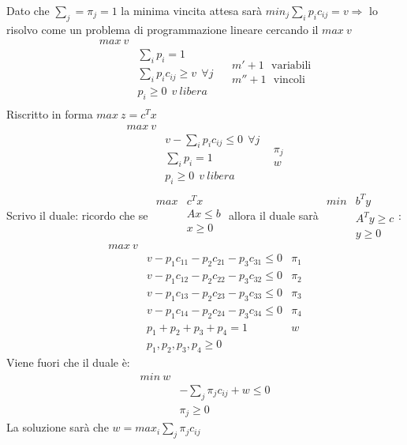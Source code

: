 \documentclass[12pt,a4paper]{article}
\begin{document}
Dato che $\sum_j = \pi_j =1$ la minima vincita attesa sarà $min_j\sum_ip_i c_{ij} = v \Rightarrow$ lo risolvo come un problema di programmazione lineare cercando il $max \ v$
 $$\begin{array}{rl}
 max \ v & \\
  & \sum_ip_i =1\\
  & \sum_i p_i c_{ij} \geq v \ \ \forall j\\
  & p_i \geq 0 \ \ v \ libera\\
 \end{array} \ \ \ \ \begin{array}{c}
 m' + 1 \ \ \ \text{variabili}\\
 m'' + 1 \ \ \ \text{vincoli}
 \end{array}$$
 Riscritto in forma $max \ z = c^Tx$
  $$\begin{array}{rl}
 max \ v & \\
  & v - \sum_i p_i c_{ij} \leq 0 \ \ \forall j\\
  & \sum_ip_i =1\\
  & p_i \geq 0 \ \ v \ libera\\
 \end{array}\ \ 
 \begin{array}{c}
 \pi_j\\
 w
 \end{array}$$
 Scrivo il duale: ricordo che se $\begin{array}{rl}max & c^Tx \\
 & Ax \leq b\\
 & x \geq 0\\
 \end{array}$ allora il duale sarà $\begin{array}{rl}
 min & b^Ty\\
 & A^Ty \geq c\\
 & y \geq 0 \end{array}$: 
 $$\begin{array}{rlc}
 max \ v &  & \\
 & v-p_1c_{11}-p_2c_{21}-p_3c_{31} \leq 0 & \pi_1\\
 & v-p_1c_{12}-p_2c_{22}-p_3c_{32} \leq 0 & \pi_2\\
 & v-p_1c_{13}-p_2c_{23}-p_3c_{33} \leq 0 & \pi_3\\
 & v-p_1c_{14}-p_2c_{24}-p_3c_{34} \leq 0 & \pi_4\\
 & p_1+p_2+p_3+p_4 = 1 & w\\
 & p_1,p_2,p_3,p_4 \geq 0
 \end{array}$$
 Viene fuori che il duale è:
 $$\begin{array}{rl}
 min\ w & \\
 & - \sum_j\pi_j c_{ij} + w \leq 0\\
 & \pi_j \geq 0
 \end{array}$$
 La soluzione sarà che $w=max_i \sum_j \pi_j c_{ij}$
 
\end{document}
